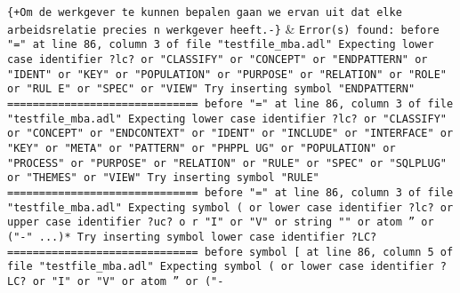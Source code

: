 \texttt{\{+Om de werkgever te kunnen bepalen gaan we ervan uit dat elke arbeidsrelatie precies n werkgever heeft.-\}} & \texttt{Error(s) found:\newline
  \newline
  before "=" at line 86, column 3 of file "testfile\_mba.adl"\newline
  Expecting lower case identifier ?lc? or "CLASSIFY" or "CONCEPT" or "ENDPATTERN"\newline
  or "IDENT" or "KEY" or "POPULATION" or "PURPOSE" or "RELATION" or "ROLE" or "RUL\newline
  E" or "SPEC" or "VIEW"\newline
  Try inserting symbol "ENDPATTERN"\newline
  \newline
  ==============================\newline
  \newline
  before "=" at line 86, column 3 of file "testfile\_mba.adl"\newline
  Expecting lower case identifier ?lc? or "CLASSIFY" or "CONCEPT" or "ENDCONTEXT"\newline
  or "IDENT" or "INCLUDE" or "INTERFACE" or "KEY" or "META" or "PATTERN" or "PHPPL\newline
  UG" or "POPULATION" or "PROCESS" or "PURPOSE" or "RELATION" or "RULE" or "SPEC"\newline
  or "SQLPLUG" or "THEMES" or "VIEW"\newline
  Try inserting symbol "RULE"\newline
  \newline
  ==============================\newline
  \newline
  before "=" at line 86, column 3 of file "testfile\_mba.adl"\newline
  Expecting symbol ( or lower case identifier ?lc? or upper case identifier ?uc? o\newline
  r "I" or "V" or string "" or atom '' or ("-" ...)*\newline
  Try inserting symbol lower case identifier ?LC?\newline
  \newline
  ==============================\newline
  \newline
  before symbol [ at line 86, column 5 of file "testfile\_mba.adl"\newline
  Expecting symbol ( or lower case identifier ?LC? or "I" or "V" or atom '' or ("-\newline
}
